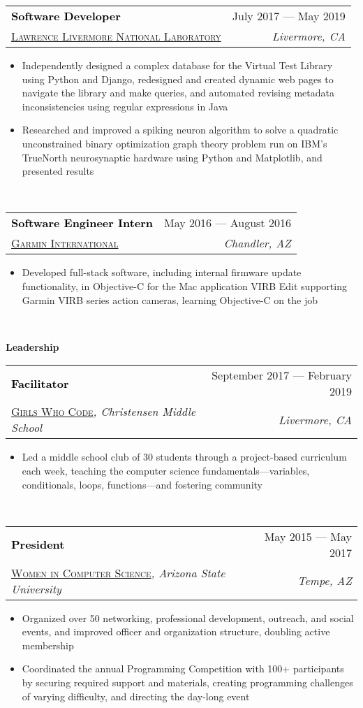 \documentclass[letterpaper,11pt]{article}
\makeatletter
\newcommand{\resumeSpacing}{5pt}
\newcommand{\resumeSection}[1]{
  \begin{flushleft}
  {\LARGE
  \textcolor{accent}{\textbf{#1}}
  \hrulefill}
  \end{flushleft}
}
\newcommand{\resumeSubsection}[6]{
  \begin{center}
  \vspace{-2.5pt}
	\begin{tabular*}{\textwidth}{l@{\extracolsep{\fill}}r}
	\large\textcolor{black}{\textbf{#1}} & \small\textcolor{accent}{#2} \\
  \href{#4}{\textsc{#3}}\textit{#6} & \textit{#5} \\
	\end{tabular*}
  \vspace{-\resumeSpacing}
  \end{center}
}
\newenvironment{resumeItemize}{
  \addtolength{\leftmargini}{-\resumeSpacing}
  \begin{minipage}{0.99\textwidth}
  \begin{itemize}
  \small
}{
  \end{itemize}
  \vspace{0pt}
  \end{minipage}
  \normalsize
  \ \\
}
\newcommand{\resumeItem}[1]
{
  \raggedright
  \item{#1}
  \vspace{-\resumeSpacing}
}
\makeatother
\begin{document}
  \resumeSubsection
  {Software Developer}{July 2017 --- May 2019}
  {Lawrence Livermore National Laboratory}{https://www.llnl.gov/}{Livermore, CA}{}
  \begin{resumeItemize}
	  \resumeItem
    {Independently designed a complex database for the Virtual Test Library using Python and Django, redesigned and created dynamic web pages to navigate the library and make queries, and automated revising metadata inconsistencies using regular expressions in Java}
	  \resumeItem
	  {Researched and improved a spiking neuron algorithm to solve a quadratic unconstrained binary optimization graph theory problem run on IBM's TrueNorth neurosynaptic hardware using Python and Matplotlib, and presented results}
  \end{resumeItemize}
	\resumeSubsection
  {Software Engineer Intern}{May 2016 --- August 2016}
  {Garmin International}{https://www.garmin.com/}{Chandler, AZ}{}
	\begin{resumeItemize}
	\resumeItem
	{Developed full-stack software, including internal firmware update functionality, in Objective-C for the Mac application VIRB Edit supporting Garmin VIRB series action cameras, learning Objective-C on the job}
	\end{resumeItemize}
  \resumeSection{Leadership}
  \resumeSubsection
  {Facilitator}{September 2017 --- February 2019}
  {Girls Who Code}{https://girlswhocode.com/}{Livermore, CA}{, Christensen Middle School}
  \begin{resumeItemize}
  \resumeItem
    {Led a middle school club of 30 students through a project-based curriculum each week, teaching the computer science fundamentals---variables, conditionals, loops, functions---and fostering community}
  \end{resumeItemize}
  \resumeSubsection
  {President}{May 2015 --- May 2017}
  {Women in Computer Science}{http://wics-asu.org/}{Tempe, AZ}{, Arizona State University}
  \begin{resumeItemize}
	  \resumeItem
    {Organized over 50 networking, professional development, outreach, and social events, and improved officer and organization structure, doubling active membership}
	  \resumeItem
    {Coordinated the annual Programming Competition with 100+ participants by securing required support and materials, creating programming challenges of varying difficulty, and directing the day-long event}
  \end{resumeItemize}
\end{document}
